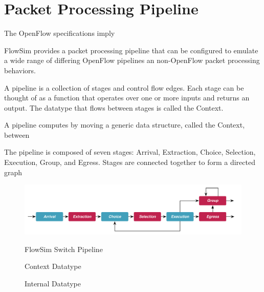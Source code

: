 \section{Packet Processing Pipeline}

The OpenFlow specifications imply 






FlowSim provides a packet processing pipeline that can be configured to emulate
a wide range of differing OpenFlow pipelines an non-OpenFlow packet processing
behaviors.

A pipeline is a collection of stages and control flow edges. Each stage can be
thought of as a function that operates over one or more inputs and returns an 
output. The datatype that flows between stages is called the Context.

A pipeline computes
by moving a generic data structure, called the Context, between 

The pipeline is composed of seven stages: Arrival, Extraction, Choice, 
Selection, Execution, Group, and Egress. Stages are connected together to
form a directed graph

\begin{figure}[h]
  \includegraphics[width=\linewidth]{figures/pipeline.pdf}
  \label{figure:pipeline}
  \caption{FlowSim Switch Pipeline}
\end{figure}

\begin{figure}
  
  \label{listing:context}
  \caption{Context Datatype}
\end{figure}

\begin{figure}
  
  \label{listing:internal}
  \caption{Internal Datatype}
\end{figure}

